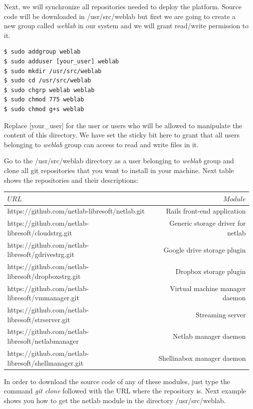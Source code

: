 \documentclass{article}
\begin{document}
Next, we will synchronize all repositories needed to deploy the platform. Source code will be downloaded in /usr/src/weblab but first we are going to create a new group called \textit{weblab} in our system and we will grant read/write permission to it.

\begin{verbatim}
$ sudo addgroup weblab
$ sudo adduser [your_user] weblab
$ sudo mkdir /usr/src/weblab
$ sudo cd /usr/src/weblab
$ sudo chgrp weblab weblab
$ sudo chmod 775 weblab
$ sudo chmod g+s weblab
\end{verbatim}

Replace [your\_user] for the user or users who will be allowed to manipulate the content of this directory. We have set the sticky bit here to grant that all users belonging to \textit{weblab} group can access to read and write files in it.

Go to the /usr/src/weblab directory as a user belonging to \textit{weblab} group and clone all git repositories that you want to install in your machine. Next table shows the repositories and their descriptions:

\begin{center}
\begin{tabular}{|l|r|}
	\hline
$URL$ & $Module$  \\
	\hline
https://github.com/netlab-libresoft/netlab.git   &  Rails front-end application \\
https://github.com/netlab-libresoft/cloudstrg.git   & Generic storage driver for netlab \\
https://github.com/netlab-libresoft/gdrivestrg.git   & Google drive storage plugin  \\
https://github.com/netlab-libresoft/dropboxstrg.git   & Dropbox storage plugin  \\
https://github.com/netlab-libresoft/vmmanager.git   & Virtual machine manager daemon \\
https://github.com/netlab-libresoft/strserver.git   & Streaming server \\
https://github.com/netlab-libresoft/netlabmanager & Netlab manager daemon \\
https://github.com/netlab-libresoft/shellmanager.git & Shellinabox manager daemon \\
	\hline
\end{tabular}
\end{center}

In order to download the source code of any of these modules, just type the command \textit{git clone} followed with the URL where the repository is. Next example shows you how to get the netlab module in the directory /usr/src/weblab.
\end{document}

